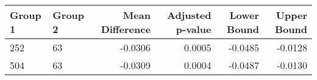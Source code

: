 \begin{tabular}{llrrrr}
\toprule
Group 1 & Group 2 & Mean Difference & Adjusted p-value & Lower Bound & Upper Bound \\
\midrule
252 & 63 & -0.0306 & 0.0005 & -0.0485 & -0.0128 \\
504 & 63 & -0.0309 & 0.0004 & -0.0487 & -0.0130 \\
\bottomrule
\end{tabular}
